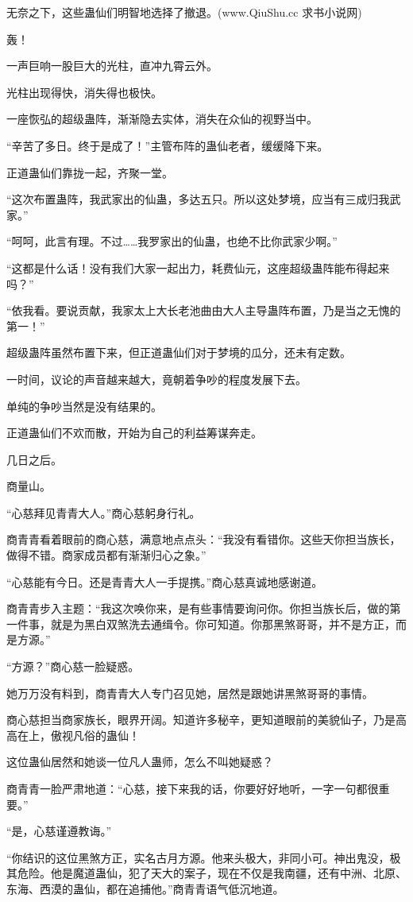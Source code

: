 \begin{this_body}
无奈之下，这些蛊仙们明智地选择了撤退。(www.QiuShu.cc 求书小说网)

轰！

一声巨响一股巨大的光柱，直冲九霄云外。

光柱出现得快，消失得也极快。

一座恢弘的超级蛊阵，渐渐隐去实体，消失在众仙的视野当中。

“辛苦了多日。终于是成了！”主管布阵的蛊仙老者，缓缓降下来。

正道蛊仙们靠拢一起，齐聚一堂。

“这次布置蛊阵，我武家出的仙蛊，多达五只。所以这处梦境，应当有三成归我武家。”

“呵呵，此言有理。不过……我罗家出的仙蛊，也绝不比你武家少啊。”

“这都是什么话！没有我们大家一起出力，耗费仙元，这座超级蛊阵能布得起来吗？”

“依我看。要说贡献，我家太上大长老池曲由大人主导蛊阵布置，乃是当之无愧的第一！”

超级蛊阵虽然布置下来，但正道蛊仙们对于梦境的瓜分，还未有定数。

一时间，议论的声音越来越大，竟朝着争吵的程度发展下去。

单纯的争吵当然是没有结果的。

正道蛊仙们不欢而散，开始为自己的利益筹谋奔走。

几日之后。

商量山。

“心慈拜见青青大人。”商心慈躬身行礼。

商青青看着眼前的商心慈，满意地点点头：“我没有看错你。这些天你担当族长，做得不错。商家成员都有渐渐归心之象。”

“心慈能有今日。还是青青大人一手提携。”商心慈真诚地感谢道。

商青青步入主题：“我这次唤你来，是有些事情要询问你。你担当族长后，做的第一件事，就是为黑白双煞洗去通缉令。你可知道。你那黑煞哥哥，并不是方正，而是方源。”

“方源？”商心慈一脸疑惑。

她万万没有料到，商青青大人专门召见她，居然是跟她讲黑煞哥哥的事情。

商心慈担当商家族长，眼界开阔。知道许多秘辛，更知道眼前的美貌仙子，乃是高高在上，傲视凡俗的蛊仙！

这位蛊仙居然和她谈一位凡人蛊师，怎么不叫她疑惑？

商青青一脸严肃地道：“心慈，接下来我的话，你要好好地听，一字一句都很重要。”

“是，心慈谨遵教诲。”

“你结识的这位黑煞方正，实名古月方源。他来头极大，非同小可。神出鬼没，极其危险。他是魔道蛊仙，犯了天大的案子，现在不仅是我南疆，还有中洲、北原、东海、西漠的蛊仙，都在追捕他。”商青青语气低沉地道。


\end{this_body}
